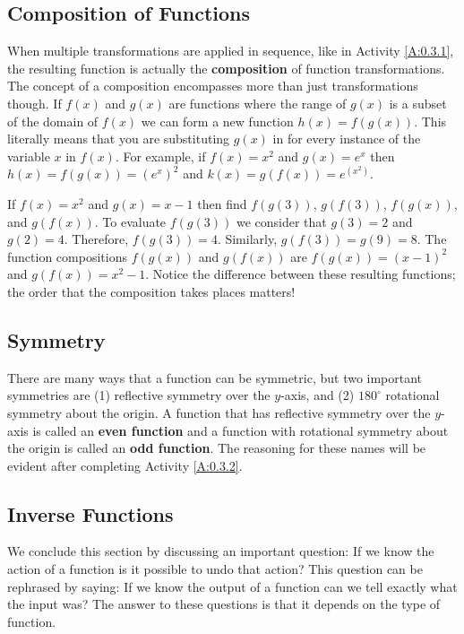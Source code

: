 



\subsection*{Composition of Functions}
When multiple transformations are applied in sequence, like in Activity \ref{A:0.3.1}, the
resulting function is actually the {\bf composition} of function transformations.  The
concept of a composition encompasses more than just transformations though.  If $f(x)$ and
$g(x)$ are functions where the range of $g(x)$ is a subset of the domain of $f(x)$ we can
form a new function $h(x) = f(g(x))$. This literally means that you are substituting
$g(x)$ in for every instance of the variable $x$ in $f(x)$.  For example, if $f(x) = x^2$
and $g(x) = e^x$ then $h(x) = f(g(x)) = \left( e^x \right)^2$ and $k(x) = g(f(x)) =
e^{(x^2)}$.  

\bex
If $f(x) = x^2$ and $g(x) = x-1$ then find $f(g(3))$, $g(f(3))$, $f(g(x))$, and
$g(f(x))$.
\eex
To evaluate $f(g(3))$ we consider that $g(3) = 2$ and $g(2) = 4$.  Therefore, $f(g(3))=4$.
Similarly, $g(f(3)) = g(9) = 8$.  The function compositions $f(g(x))$ and $g(f(x))$ are
$f(g(x)) = (x-1)^2$ and $g(f(x))=x^2 - 1$.  Notice the difference between these resulting
functions; the order that the composition takes places matters!
\afterex

\subsection*{Symmetry}
There are many ways that a function can be symmetric, but two important symmetries are (1)
reflective symmetry over the $y$-axis, and (2) $180^\circ$ rotational symmetry about the
origin.  A function that has reflective symmetry over the $y$-axis is called an {\bf even
function} and a function with rotational symmetry about the origin is called an {\bf odd
function}.  The reasoning for these names will be evident after completing Activity
\ref{A:0.3.2}.



\subsection*{Inverse Functions}
We conclude this section by discussing an important question:  If we know the action of a
function is it possible to undo that action? This question can be rephrased by saying: If
we know the output of a function can we tell exactly what the input was?  The answer to
these questions is that it depends on the type of function.  

